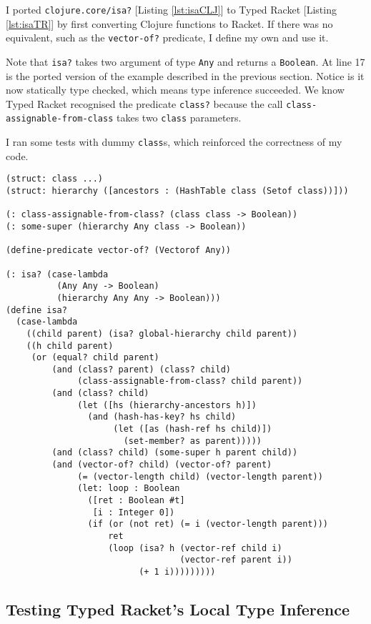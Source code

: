 \documentclass[12pt,a4paper]{article}
\begin{document}
I ported \lstinline|clojure.core/isa?| [Listing \ref{lst:isaCLJ}] to Typed Racket [Listing \ref{lst:isaTR}] by
first converting Clojure functions to Racket. If there was no
equivalent, such as the \lstinline|vector-of?| predicate, I define my own
and use it.

Note that \lstinline|isa?| takes two argument of type \lstinline|Any|
and returns a \lstinline|Boolean|. At line 17 is the ported version of
the example described in the previous section. Notice is it now statically
type checked, which means type inference succeeded. We know Typed Racket
recognised the predicate \lstinline|class?| because the call 
\lstinline|class-assignable-from-class| takes two \lstinline|class|
parameters.

I ran some tests with dummy \lstinline|class|s, which reinforced
the correctness of my code.


\begin{lstlisting}[caption=isa? Typed Racket Port, label=lst:isaTR]
(struct: class ...)
(struct: hierarchy ([ancestors : (HashTable class (Setof class))]))

(: class-assignable-from-class? (class class -> Boolean))
(: some-super (hierarchy Any class -> Boolean))

(define-predicate vector-of? (Vectorof Any))

(: isa? (case-lambda
          (Any Any -> Boolean)
          (hierarchy Any Any -> Boolean)))
(define isa?
  (case-lambda
    ((child parent) (isa? global-hierarchy child parent))
    ((h child parent)
     (or (equal? child parent)
         (and (class? parent) (class? child)
              (class-assignable-from-class? child parent))
         (and (class? child)
              (let ([hs (hierarchy-ancestors h)])
                (and (hash-has-key? hs child)
                     (let ([as (hash-ref hs child)])
                       (set-member? as parent)))))
         (and (class? child) (some-super h parent child))
         (and (vector-of? child) (vector-of? parent)
              (= (vector-length child) (vector-length parent))
              (let: loop : Boolean
                ([ret : Boolean #t] 
                 [i : Integer 0])
                (if (or (not ret) (= i (vector-length parent)))
                    ret
                    (loop (isa? h (vector-ref child i)
                                  (vector-ref parent i)) 
                          (+ 1 i)))))))))
\end{lstlisting}

\subsection{Testing Typed Racket's Local Type Inference}
\end{document}
